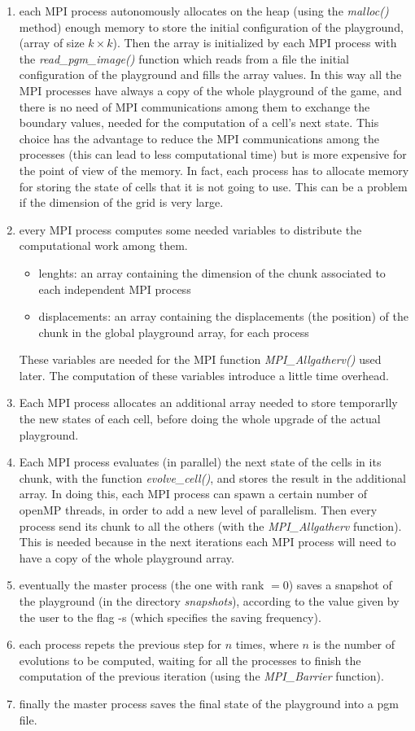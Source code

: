 \documentclass[12pt, titlepage]{report}
\begin{document}
\begin{enumerate}
	\item each MPI process autonomously allocates on the heap (using the \emph{malloc()} method) enough memory to store the initial configuration of the playground, 
	(array of size $k\times k$). Then the array is initialized by each MPI process with the \emph{read\_pgm\_image()} function which reads from a file 
	the initial configuration of the playground and fills the array values. In this way all the MPI processes have always a copy
    of the whole playground of the game, and there is no need of MPI communications among them to exchange
    the boundary values, needed for the computation of a cell's next state. 
    This choice has the advantage to reduce the MPI communications among the processes (this can lead to 
    less computational time) but is more expensive for the point of view of the memory. In fact, each process has to 
    allocate memory for storing the state of cells that it is not going to use. This can be a problem if the dimension of the grid is very large.
	\item every MPI process computes some needed variables to distribute the computational work among them.
	\begin{itemize}
		\item lenghts: an array containing the dimension of the chunk associated to each independent MPI process
		\item displacements: an array containing the displacements (the position) of the chunk in the global playground array, for each process
	\end{itemize}
	These variables are needed for the MPI function \emph{MPI\_Allgatherv()} used later. The computation of these variables introduce a little time overhead. 
	\item Each MPI process allocates an additional array needed to store temporarlly the new states of each cell, before doing the whole upgrade of the actual playground.
	\item Each MPI process evaluates (in parallel) the next state of the cells in its chunk, with the function \emph{evolve\_cell()}, and stores
	the result in the additional array. In doing this, each MPI process can spawn a certain number of openMP threads, in order to add a new level of parallelism.
	Then every process send its chunk to all the others (with the \emph{MPI\_Allgatherv} function). This is needed because in the next iterations each
	MPI process will need to have a copy of the whole playground array.
	\item eventually the master process (the one with rank $= 0$) saves a snapshot of the playground (in the directory \emph{snapshots}),
	according to the value given by the user to the flag -s (which specifies the saving frequency).
	\item each process repets the previous step for $n$ times, where $n$ is the number of evolutions to be computed, 
	waiting for all the processes to finish the computation of the previous iteration (using the \emph{MPI\_Barrier} function).
	\item finally the master process saves the final state of the playground into a pgm file.
\end{enumerate}
\end{document}
